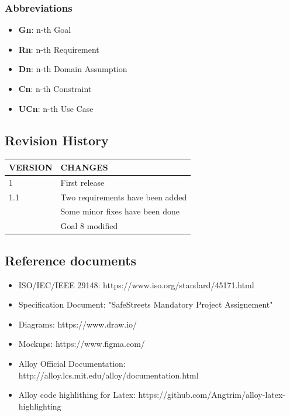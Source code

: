 \documentclass{article}
\begin{document}
\subsubsection{Abbreviations}
\begin{itemize}
    \item \textbf{Gn}: n-th Goal
    \item \textbf{Rn}: n-th Requirement 
    \item \textbf{Dn}: n-th Domain Assumption
    \item \textbf{Cn}: n-th Constraint 
    \item \textbf{UCn}: n-th Use Case
\end{itemize}

\subsection{Revision History}
\begin{center}
    \begin{tabular}{ | l | l |}
        \hline
        VERSION & CHANGES \\
        \hline
        1 & First release \\
        \hline
        1.1 & Two requirements have been added \\
            & Some minor fixes have been done \\
            & Goal 8 modified \\
        \hline
    \end{tabular}
    \end{center}

\subsection{Reference documents}
\begin{itemize}
    \item ISO/IEC/IEEE 29148: https://www.iso.org/standard/45171.html
    \item Specification Document: "SafeStreets Mandatory Project Assignement"
    \item Diagrams: https://www.draw.io/
    \item Mockups: https://www.figma.com/
    \item Alloy Official Documentation: http://alloy.lcs.mit.edu/alloy/documentation.html
    \item Alloy code highlithing for Latex: https://github.com/Angtrim/alloy-latex-highlighting
\end{itemize}
\end{document}
